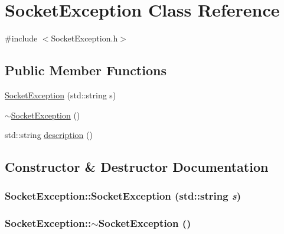 \hypertarget{classSocketException}{
\section{SocketException Class Reference}
\label{classSocketException}
}


{\ttfamily \#include $<$SocketException.h$>$}

\subsection*{Public Member Functions}
\begin{DoxyCompactItemize}
\item 
\hyperlink{classSocketException_a09ddb0c061c40fcb527ff89a2e803342}{SocketException} (std::string s)
\item 
\hyperlink{classSocketException_a659557c899329aea01977c980c4db9b9}{$\sim$SocketException} ()
\item 
std::string \hyperlink{classSocketException_ad7920caebddc99b6bbb7dbede569fa18}{description} ()
\end{DoxyCompactItemize}


\subsection{Constructor \& Destructor Documentation}
\hypertarget{classSocketException_a09ddb0c061c40fcb527ff89a2e803342}{
\subsubsection[{SocketException}]{\setlength{\rightskip}{0pt plus 5cm}SocketException::SocketException (std::string {\em s})}}
\label{classSocketException_a09ddb0c061c40fcb527ff89a2e803342}
\hypertarget{classSocketException_a659557c899329aea01977c980c4db9b9}{
\subsubsection[{$\sim$SocketException}]{\setlength{\rightskip}{0pt plus 5cm}SocketException::$\sim$SocketException ()}}
\label{classSocketException_a659557c899329aea01977c980c4db9b9}



